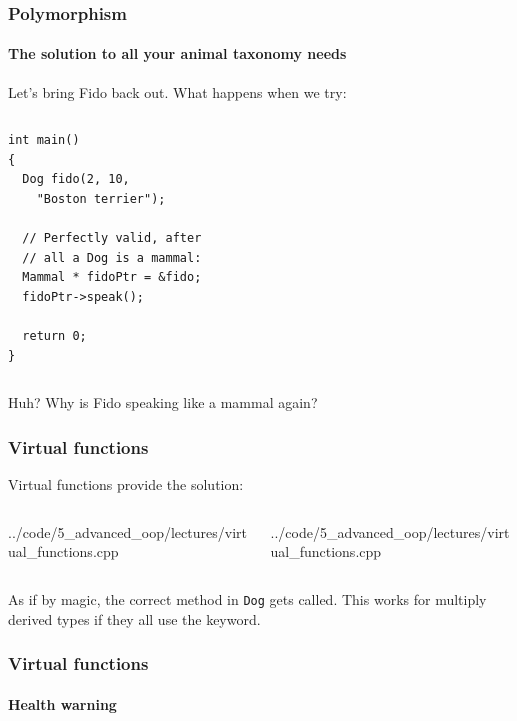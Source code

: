 \documentclass{beamer}
\begin{document}
\begin{frame}[fragile]
  \frametitle{Polymorphism}
  \framesubtitle{The solution to all your animal taxonomy needs}

	Let's bring Fido back out.  What happens when we try:
  \begin{columns}[t]
    \begin{column}[T]{0.48\linewidth}
  		\begin{lstlisting}[aboveskip=0pt]
int main()
{
  Dog fido(2, 10,
    "Boston terrier");
    
  // Perfectly valid, after
  // all a Dog is a mammal:  
  Mammal * fidoPtr = &fido;
  fidoPtr->speak();

  return 0;
}
  		\end{lstlisting}
  	\end{column}
  	\pause
  	\begin{column}[T]{0.48\linewidth}
  	\end{column}
  \end{columns}
  \pause
  Huh?  Why is Fido speaking like a mammal again?

\end{frame}

\begin{frame}[fragile]
  \frametitle{Virtual functions}
  
  Virtual functions provide the solution:
  \begin{columns}[t]
    \begin{column}[T]{0.48\linewidth}
    		{../code/5_advanced_oop/lectures/virtual_functions.cpp}
    \end{column}
    \pause
		\begin{column}[T]{0.48\linewidth}
    		{../code/5_advanced_oop/lectures/virtual_functions.cpp}
		\end{column}
	\end{columns}
	\pause
	As if by magic, the correct method in \texttt{Dog} gets called.  This works for multiply derived types if they all use the  keyword.

\end{frame}

\begin{frame}[fragile]
  \frametitle{Virtual functions}
  \framesubtitle{Health warning}
  

\end{frame}
\end{document}
